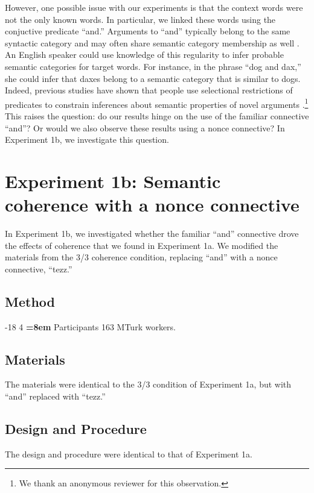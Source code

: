 \documentclass[man,longtable, floatmark]{my-apa6}
\makeatletter
\renewcommand\subsubsection{\@startsection{subsubsection}{3}{\z@}%
                       {-18\p@ \@plus -4\p@ \@minus -4\p@}%
                       {4\p@ \@plus 2\p@ \@minus 2\p@}%
                       {\normalfont\normalsize\bfseries\boldmath
                        \rightskip=\z@ \@plus 8em\pretolerance=10000 }}
\makeatother
\begin{document}
However, one possible issue with our experiments is that the context words were not the only known words.
In particular, we linked these words using the conjuctive predicate ``and.''
Arguments to ``and'' typically belong to the same syntactic category and may often share semantic category membership as well \cite{benor2006}.
An English speaker could use knowledge of this regularity to infer probable semantic categories for target words.
For instance, in the phrase ``dog and dax,'' she could infer that daxes belong to a semantic category that is similar to dogs.
Indeed, previous studies have shown that people use selectional restrictions of predicates to constrain inferences about semantic properties of novel arguments \citep{altmann1999, kohne2010}.\footnote{We thank an anonymous reviewer for this observation.}
This raises the question: do our results hinge on the use of the familiar connective ``and''?
Or would we also observe these results using a nonce connective?
In Experiment 1b, we investigate this question.

\section{Experiment 1b: Semantic coherence with a nonce connective}

In Experiment 1b, we investigated whether the familiar ``and'' connective drove the effects of coherence that we found in Experiment 1a. We modified the materials from the 3/3 coherence condition, replacing ``and'' with a nonce connective, ``tezz.''

\subsection{Method}

\subsubsection{Participants}
163 MTurk workers.

\subsection{Materials}
The materials were identical to the 3/3 condition of Experiment 1a, but with ``and'' replaced with ``tezz.''

\subsection{Design and Procedure}
The design and procedure were identical to that of Experiment 1a.
\end{document}
